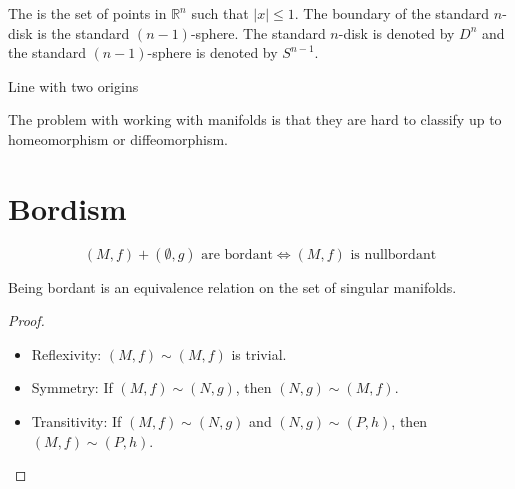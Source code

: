 \documentclass[a4paper,11pt]{article}
\begin{document}
\begin{example}
    The  is the set of points in \(\mathbb{R}^n\) such that \(|{x}|\leq1\). 
    The boundary of the standard \(n\)-disk is the standard \((n-1)\)-sphere.
    The standard \(n\)-disk is denoted by \(D^n\) and the standard \((n-1)\)-sphere is denoted by \(S^{n-1}\).
\end{example}

\begin{nonex}
    Line with two origins
\end{nonex}

The problem with working with manifolds is that they are hard to classify up to homeomorphism or diffeomorphism.

\section{Bordism}

\begin{definition}
\end{definition}

\begin{definition}[nullbordant]
\end{definition}

\begin{example}
\end{example}

\begin{definition}[bordant]
\end{definition}

\begin{remark}
    \[(M,f)+(\emptyset,g) \text{ are bordant} \iff (M,f) \text{ is nullbordant}\]
\end{remark}

\begin{example}
\end{example}

\begin{nonex}
\end{nonex}

\begin{proposition}
    Being bordant is an equivalence relation on the set of singular manifolds.
\end{proposition}

\begin{proof}
    \begin{itemize}
        \item Reflexivity: \((M,f)\sim(M,f)\) is trivial.
        \item Symmetry: If \((M,f)\sim(N,g)\), then \((N,g)\sim(M,f)\).
        \item Transitivity: If \((M,f)\sim(N,g)\) and \((N,g)\sim(P,h)\), then \((M,f)\sim(P,h)\).
    \end{itemize}
\end{proof}
\end{document}
